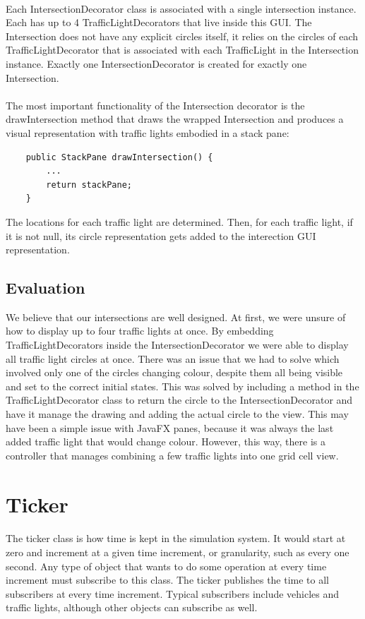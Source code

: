 \documentclass[a4paper,11pt,titlepage]{article}
\begin{document}
\paragraph{}
Each IntersectionDecorator class is associated with a single intersection instance. Each has up to 4 TrafficLightDecorators that live inside this GUI. The Intersection does not have any explicit circles itself, it relies on the circles of each TrafficLightDecorator that is associated with each TrafficLight in the Intersection instance. Exactly one IntersectionDecorator is created for exactly one Intersection.
\paragraph{}
The most important functionality of the Intersection decorator is the drawIntersection method that draws the wrapped Intersection and produces a visual representation with traffic lights embodied in a stack pane:
\begin{lstlisting}
	public StackPane drawIntersection() {
		...
		return stackPane;	
	}
\end{lstlisting}
The locations for each traffic light are determined. Then, for each traffic light, if it is not null, its circle representation gets added to the interection GUI representation.
\subsection{Evaluation}
We believe that our intersections are well designed. At first, we were unsure of how to display up to four traffic lights at once. By embedding TrafficLightDecorators inside the IntersectionDecorator we were able to display all traffic light circles at once. There was an issue that we had to solve which involved only one of the circles changing colour, despite them all being visible and set to the correct initial states. This was solved by including a method in the TrafficLightDecorator class to return the circle to the IntersectionDecorator and have it manage the drawing and adding the actual circle to the view. This may have been a simple issue with JavaFX panes, because it was always the last added traffic light that would change colour. However, this way, there is a controller that manages combining a few traffic lights into one grid cell view. 

\section{Ticker}
\paragraph{}
The ticker class is how time is kept in the simulation system. It would start at zero and increment at a given time increment, or granularity, such as every one second. Any type of object that wants to do some operation at every time increment must subscribe to this class. The ticker publishes the time to all subscribers at every time increment. Typical subscribers include vehicles and traffic lights, although other objects can subscribe as well.
\end{document}
